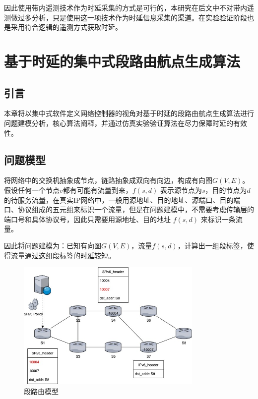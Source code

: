 因此使用带内遥测技术作为时延采集的方式是可行的，本研究在后文中不对带内遥测做过多分析，只是使用这一项技术作为时延信息采集的渠道。在实验验证阶段也是采用符合逻辑的遥测方式获取时延。


\chapter{基于时延的集中式段路由航点生成算法}

\section{引言}

本章将以集中式软件定义网络控制器的视角对基于时延的段路由航点生成算法进行问题建模分析，核心算法阐释，并通过仿真实验验证算法在尽力保障时延的有效性。

\section{问题模型}

将网络中的交换机抽象成节点，链路抽象成双向有向边，构成有向图$G(V, E)$。假设任何一个节点$v$都有可能有流量到来，$f(s, d)$ 表示源节点为$s$，目的节点为$d$的待服务流量，在真实IP网络中，一般用源地址、目的地址、源端口、目的端口、协议组成的五元组来标识一个流量，但是在问题建模中，不需要考虑传输层的端口号和具体协议号，因此只需要用源地址、目的地址 $f(s, d)$ 来标识一条流量。

因此将问题建模为：已知有向图$G(V, E)$，流量$f(s, d)$，计算出一组段标签，使得流量通过这组段标签的时延较短。

\begin{figure}[htbp]
\setlength{\abovecaptionskip}{15pt plus 3pt minus 2pt}
\centerline{\includegraphics[width=0.8\textwidth]{./figures/ch3-srv6-problem.jpg}}
\caption{段路由模型}
\label{fig-ch3-srv6-problem}
\end{figure}

